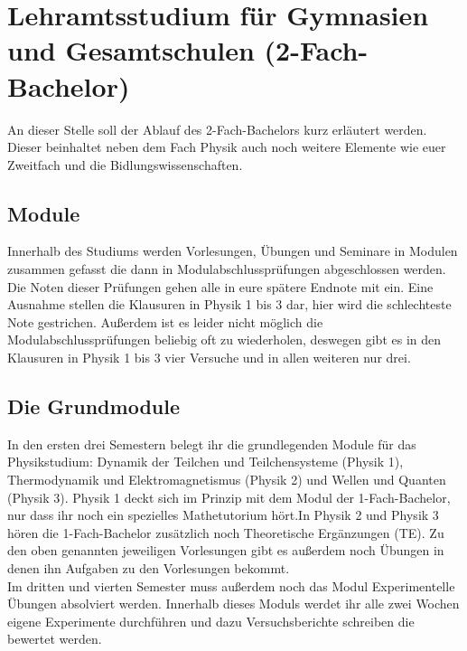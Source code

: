 \section[Lehramtsstudium für Gymnasien \& Gesamtschulen (2-Fach-Bachelor)]{Lehramtsstudium für Gymnasien und Gesamtschulen (2-Fach-Bachelor)}
\begin{multicols*}{2}
An dieser Stelle soll der Ablauf des 2-Fach-Bachelors kurz erläutert werden. Dieser beinhaltet neben dem Fach Physik auch noch weitere Elemente wie euer Zweitfach und die Bidlungswissenschaften.
\subsection*{Module}
Innerhalb des Studiums werden Vorlesungen, Übungen und Seminare in Modulen zusammen gefasst die dann in Modulabschlussprüfungen abgeschlossen werden. Die Noten dieser Prüfungen gehen alle in eure spätere Endnote mit ein. Eine Ausnahme stellen die Klausuren in Physik 1 bis 3 dar, hier wird die schlechteste Note gestrichen. Außerdem ist es leider nicht möglich die Modulabschlussprüfungen beliebig oft zu wiederholen, deswegen gibt es in den Klausuren in Physik 1 bis 3 vier Versuche und in allen weiteren nur drei.
\subsection*{Die Grundmodule}
In den ersten drei Semestern belegt ihr die grundlegenden Module für das Physikstudium: Dynamik der Teilchen und Teilchensysteme (Physik 1), Thermodynamik und Elektromagnetismus (Physik 2) und Wellen und Quanten (Physik 3). Physik 1 deckt sich im Prinzip mit dem Modul der 1-Fach-Bachelor, nur dass ihr noch ein spezielles Mathetutorium hört.In Physik 2 und Physik 3 hören die 1-Fach-Bachelor zusätzlich noch Theoretische Ergänzungen (TE). Zu den oben genannten jeweiligen Vorlesungen gibt es außerdem noch Übungen in denen ihn Aufgaben zu den Vorlesungen bekommt.\\ Im dritten und vierten Semester muss außerdem noch das Modul Experimentelle Übungen absolviert werden. Innerhalb dieses Moduls werdet ihr alle zwei Wochen eigene Experimente durchführen und dazu Versuchsberichte schreiben die bewertet werden.

\end{multicols*}
